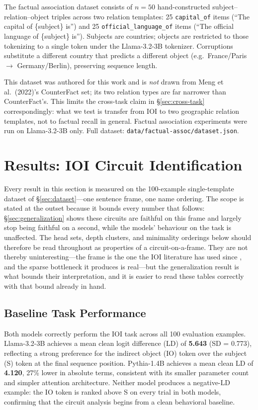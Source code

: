 \documentclass[11pt,a4paper]{article}
\begin{document}
The factual association dataset consists of $n = 50$ hand-constructed
subject--relation--object triples across two relation templates: 25 \texttt{capital\_of}
items (``The capital of \{subject\} is'') and 25 \texttt{official\_language\_of} items
(``The official language of \{subject\} is''). Subjects are countries; objects are
restricted to those tokenizing to a single token under the Llama-3.2-3B tokenizer.
Corruptions substitute a different country that predicts a different object
(e.g.\ France/Paris $\to$ Germany/Berlin), preserving sequence length.

This dataset was authored for this work and is \emph{not} drawn from Meng et al.\
(2022)'s CounterFact set; its two relation types are far narrower than CounterFact's.
This limits the cross-task claim in
\S\ref{sec:cross-task} correspondingly: what we test is transfer from IOI to two
geographic relation templates, not to factual recall in general. Factual association
experiments were run on Llama-3.2-3B only. Full dataset:
\texttt{data/factual-assoc/dataset.json}.

\section{Results: IOI Circuit Identification}
\label{sec:ioi}

Every result in this section is measured on the 100-example single-template dataset of
\S\ref{sec:dataset}---one sentence frame, one name ordering. The scope is stated at the
outset because it bounds every number that follows: \S\ref{sec:generalization} shows
these circuits are faithful on this frame and largely stop being faithful on a second,
while the models' behaviour on the task is unaffected. The head sets, depth
clusters, and minimality orderings below should therefore be read throughout as
properties of a circuit-on-a-frame. They are not thereby uninteresting---the frame is the
one the IOI literature has used since \citet{wang2022interpretability}, and the sparse
bottleneck it produces is real---but the generalization result is what bounds their
interpretation, and it is easier to read these tables correctly with that bound already
in hand.

\subsection{Baseline Task Performance}

Both models correctly perform the IOI task across all 100 evaluation examples.
Llama-3.2-3B achieves a mean clean logit difference (LD) of \textbf{5.643}
(SD = 0.773), reflecting a strong preference for the indirect object (IO) token over
the subject (S) token at the final sequence position. Pythia-1.4B achieves a mean
clean LD of \textbf{4.120}, 27\% lower in absolute terms, consistent with its smaller
parameter count and simpler attention architecture. Neither model produces a
negative-LD example: the IO token is ranked above S on every trial in both models,
confirming that the circuit analysis begins from a clean behavioral baseline.
\end{document}
